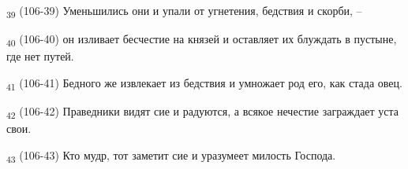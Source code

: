 \begin{tcolorbox}
\textsubscript{39} (106-39) Уменьшились они и упали от угнетения, бедствия и скорби, --
\end{tcolorbox}
\begin{tcolorbox}
\textsubscript{40} (106-40) он изливает бесчестие на князей и оставляет их блуждать в пустыне, где нет путей.
\end{tcolorbox}
\begin{tcolorbox}
\textsubscript{41} (106-41) Бедного же извлекает из бедствия и умножает род его, как стада овец.
\end{tcolorbox}
\begin{tcolorbox}
\textsubscript{42} (106-42) Праведники видят сие и радуются, а всякое нечестие заграждает уста свои.
\end{tcolorbox}
\begin{tcolorbox}
\textsubscript{43} (106-43) Кто мудр, тот заметит сие и уразумеет милость Господа.
\end{tcolorbox}
